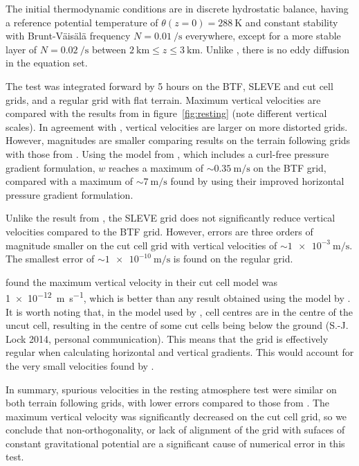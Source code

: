 \documentclass[twocol]{ametsoc}
\begin{document}
The initial thermodynamic conditions are in discrete hydrostatic balance, having a reference potential temperature of $\theta(z = 0) = \SI{288}{\kelvin}$ and constant stability with Brunt-V\"ais\"al\"a frequency $N = \SI{0.01}{\per\second}$ everywhere, except for a more stable layer of $N = \SI{0.02}{\per\second}$ between $\SI{2}{\kilo\meter} \leq z \leq \SI{3}{\kilo\meter}$.  Unlike \citet{klemp2011}, there is no eddy diffusion in the equation set.

The test was integrated forward by 5 hours on the BTF, SLEVE and cut cell grids, and a regular grid with flat terrain.  Maximum vertical velocities are compared with the results from \citet{klemp2011} in figure~\ref{fig:resting} (note different vertical scales).  In agreement with \citet{klemp2011}, vertical velocities are larger on more distorted grids.  However, magnitudes are smaller comparing results on the terrain following grids with those from \citet{klemp2011}.  Using the model from \citet{weller-shahrokhi2014}, which includes a curl-free pressure gradient formulation, $w$ reaches a maximum of \(\sim \SI{0.35}{\meter\per\second}\) on the BTF grid, compared with a maximum of \(\sim \SI{7}{\meter\per\second}\) found by \citet{klemp2011} using their improved horizontal pressure gradient formulation.

Unlike the result from \citet{klemp2011}, the SLEVE grid does not significantly reduce vertical velocities compared to the BTF grid.  However, errors are three orders of magnitude smaller on the cut cell grid with vertical velocities of \(\sim \SI{1e-3}{\meter\per\second}\).  The smallest error of \(\sim \SI{1e-10}{\meter\per\second}\) is found on the regular grid.

\citet{good2014} found the maximum vertical velocity in their cut cell model was \SI{1e-12}{\meter\per\second}, which is better than any result obtained using the model by \citet{weller-shahrokhi2014}.  It is worth noting that, in the model used by \citet{good2014}, cell centres are in the centre of the uncut cell, resulting in the centre of some cut cells being below the ground (S.-J. Lock 2014, personal communication).  This means that the grid is effectively regular when calculating horizontal and vertical gradients.  This would account for the very small velocities found by \citet{good2014}.

In summary, spurious velocities in the resting atmosphere test were similar on both terrain following grids, with lower errors compared to those from \citet{klemp2011}.  The maximum vertical velocity was significantly decreased on the cut cell grid, so we conclude that non-orthogonality, or lack of alignment of the grid with sufaces of constant gravitational potential are a significant cause of numerical error in this test.
\end{document}
